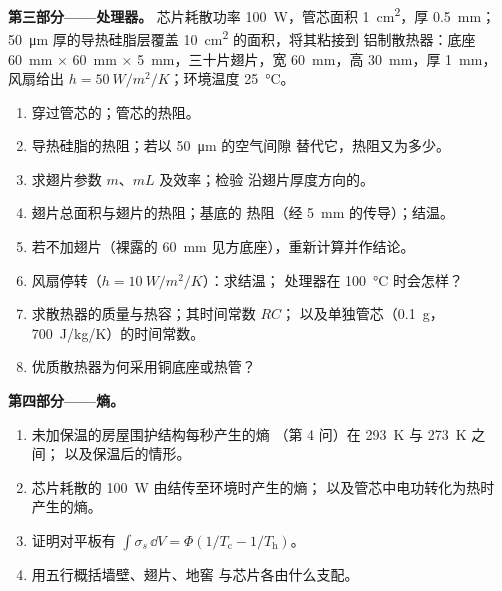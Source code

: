 \begin{problem}
\textbf{第三部分——处理器。}
芯片耗散功率 \qty{100}{W}，管芯面积 \qty{1}{cm^2}，厚 \qty{0.5}{mm}；
\qty{50}{\micro m} 厚的导热硅脂层覆盖 \qty{10}{cm^2} 的面积，将其粘接到
铝制散热器：底座 \qty{60}{mm} $\times$ \qty{60}{mm} $\times$
\qty{5}{mm}，三十片翅片，宽 \qty{60}{mm}，高 \qty{30}{mm}，厚 \qty{1}{mm}，
风扇给出 $h = \qty{50}{W/m^2/K}$；环境温度 \qty{25}{\celsius}。
\begin{enumerate}[resume]
  \item 穿过管芯的；管芯的热阻。
  \item 导热硅脂的热阻；若以 \qty{50}{\micro m} 的空气间隙
        替代它，热阻又为多少。
  \item 求翅片参数 $m$、$mL$ 及效率；检验
        沿翅片厚度方向的。
  \item 翅片总面积与翅片的热阻；基底的
        热阻（经 \qty{5}{mm} 的传导）；结温。
  \item 若不加翅片（裸露的 \qty{60}{mm} 见方底座），重新计算并作结论。
  \item 风扇停转（$h = \qty{10}{W/m^2/K}$）：求结温；
        处理器在 \qty{100}{\celsius} 时会怎样？
  \item 求散热器的质量与热容；其时间常数 $RC$；
        以及单独管芯（\qty{0.1}{g}，\qty{700}{J/kg/K}）的时间常数。
  \item 优质散热器为何采用铜底座或热管？
\end{enumerate}

\textbf{第四部分——熵。}
\begin{enumerate}[resume]
  \item 未加保温的房屋围护结构每秒产生的熵
        （第 4 问）在 \qty{293}{K} 与 \qty{273}{K} 之间；
        以及保温后的情形。
  \item 芯片耗散的 \qty{100}{W} 由结传至环境时产生的熵；
        以及管芯中电功转化为热时
        产生的熵。
  \item 证明对平板有 $\int\sigma_s\,\dd V = \Phi(1/T_{\text{c}} -
        1/T_{\text{h}})$。
  \item 用五行概括墙壁、翅片、地窖
        与芯片各由什么支配。
\end{enumerate}
\end{problem}
